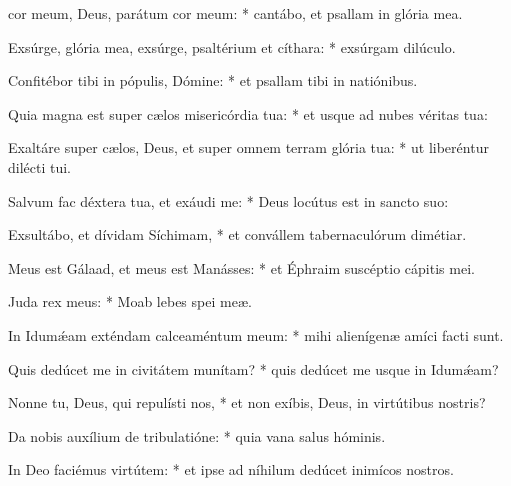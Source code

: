\begin{psalmus}

		  cor meum, Deus, parátum cor meum: * cantábo, et psallam in glória mea.
		 
		 Exsúrge, glória mea, exsúrge, psaltérium et cíthara: * exsúrgam dilúculo.
		 
		 Confitébor tibi in pópulis, Dómine: * et psallam tibi in natiónibus.
		 
		 Quia magna est super cælos misericórdia tua: * et usque ad nubes véritas tua:
		 
		 Exaltáre super cælos, Deus, et super omnem terram glória tua: * ut liberéntur dilécti tui.
		 
		 Salvum fac déxtera tua, et exáudi me: * Deus locútus est in sancto suo:
		 
		 Exsultábo, et dívidam Síchimam, * et convállem tabernaculórum dimétiar.
		 
		 Meus est Gálaad, et meus est Manásses: * et Éphraim suscéptio cápitis mei.
		 
		 Juda rex meus: * Moab lebes spei meæ.
		 
		 In Idumǽam exténdam calceaméntum meum: * mihi alienígenæ amíci facti sunt.
		 
		 Quis dedúcet me in civitátem munítam? * quis dedúcet me usque in Idumǽam?
		 
		 Nonne tu, Deus, qui repulísti nos, * et non exíbis, Deus, in virtútibus nostris?
		 
		 Da nobis auxílium de tribulatióne: * quia vana salus hóminis.
		 
		 In Deo faciémus virtútem: * et ipse ad níhilum dedúcet inimícos nostros.

\end{psalmus}
